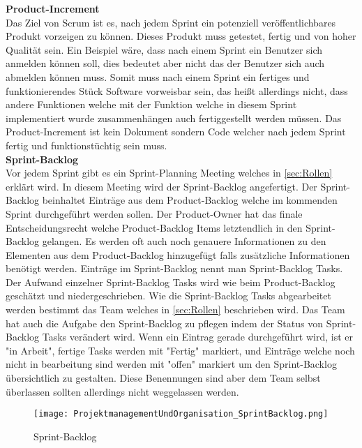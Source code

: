 			\textbf{Product-Increment} \\
			Das Ziel von Scrum ist es, nach jedem Sprint ein potenziell veröffentlichbares Produkt vorzeigen zu können. Dieses Produkt muss getestet, fertig und von hoher Qualität sein. Ein Beispiel wäre, dass nach einem Sprint ein Benutzer sich anmelden können soll, dies bedeutet aber nicht das der Benutzer sich auch abmelden können muss. Somit muss nach einem Sprint ein fertiges und funktionierendes Stück Software vorweisbar sein, das heißt allerdings nicht, dass andere Funktionen welche mit der Funktion welche in diesem Sprint implementiert wurde zusammenhängen auch fertiggestellt werden müssen. Das Product-Increment ist kein Dokument sondern Code welcher nach jedem Sprint fertig und funktionstüchtig sein muss. \textcite{ScrumProduct-Increment}\\

			\textbf{Sprint-Backlog} \\ 
			Vor jedem Sprint gibt es ein Sprint-Planning Meeting welches in \ref{sec:Rollen} erklärt wird. In diesem Meeting wird der Sprint-Backlog angefertigt. Der Sprint-Backlog beinhaltet Einträge aus dem Product-Backlog welche im kommenden Sprint durchgeführt werden sollen. Der Product-Owner hat das finale Entscheidungsrecht welche Product-Backlog Items letztendlich in den Sprint-Backlog gelangen. Es werden oft auch noch genauere Informationen zu den Elementen aus dem Product-Backlog hinzugefügt falls zusätzliche Informationen benötigt werden.
			Einträge im Sprint-Backlog nennt man Sprint-Backlog Tasks. Der Aufwand einzelner Sprint-Backlog Tasks wird wie beim Product-Backlog geschätzt und niedergeschrieben.
			Wie die Sprint-Backlog Tasks abgearbeitet werden bestimmt das Team welches in \ref{sec:Rollen} beschrieben wird. Das Team hat auch die Aufgabe den Sprint-Backlog zu pflegen indem der Status von Sprint-Backlog Tasks verändert wird. Wenn ein Eintrag gerade durchgeführt wird, ist er "in Arbeit", fertige Tasks werden mit "Fertig" markiert, und Einträge welche noch nicht in bearbeitung sind werden mit "offen" markiert um den Sprint-Backlog übersichtlich zu gestalten. Diese Benennungen sind aber dem Team selbst überlassen sollten allerdings nicht weggelassen werden. \textcite{ScrumSprint-Backlog} \\ 
			
\begin{figure}[H]
	\texttt{[image: ProjektmanagementUndOrganisation\_SprintBacklog.png]}
    \caption{Sprint-Backlog}
    \label{fig:sprintBacklog}
\end{figure}
		
